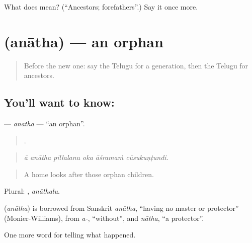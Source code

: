 \begin{tcolorbox}[breakable,colback=teal!4,colframe=teal!35!black,title={Before you move on}]
What does  mean? (\textquotedblleft{}Ancestors; forefathers\textquotedblright{}.) Say it once more.
\end{tcolorbox}
\section[\texorpdfstring{\te{అనాథ} (anātha)}{అనాథ (anātha)}]{ (anātha) — an orphan}

\label{lesson:TE-C357-anatha}



\begin{quote}
Before the new one: say the Telugu for a generation, then the Telugu for ancestors.
\end{quote}

\subsection*{You'll want to know: }
\textbf{} — \emph{anātha} — \textquotedblleft{}an orphan\textquotedblright{}.

\begin{quote}
     .
\end{quote}

\begin{quote}
\emph{ā anātha pillalanu oka āśramaṁ cūsukuṇṭundi.}
\end{quote}

\begin{quote}
A home looks after those orphan children.
\end{quote}

Plural: , \emph{anāthalu}.

\begin{cousinweb}
\textbf{} (\emph{anātha}) is borrowed from Sanskrit \emph{anātha}, \textquotedblleft{}having no master or protector\textquotedblright{} (Monier-Williams), from \emph{a-}, \textquotedblleft{}without\textquotedblright{}, and \emph{nātha}, \textquotedblleft{}a protector\textquotedblright{}.
\end{cousinweb}

\begin{grammarlens}[title={What you've built}]
One more word for telling what happened.
\end{grammarlens}

